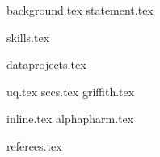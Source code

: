\documentclass[hidelinks, 12pt]{article}
\begin{document}
{background.tex}
\vspace{-13mm}
{statement.tex}

\vspace{1mm}
{skills.tex}

\vspace{2mm}
{dataprojects.tex}


{uq.tex}
\vspace{3mm}
{sccs.tex}
\vspace{3mm}
{griffith.tex}

\vspace{1mm}
{inline.tex}
\vspace{3mm}
{alphapharm.tex}

\vspace{1mm}
{referees.tex}
\end{document}
